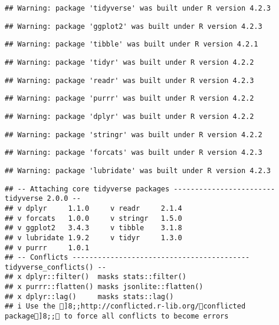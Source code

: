 \documentclass[
]{article}
\begin{document}
\begin{verbatim}
## Warning: package 'tidyverse' was built under R version 4.2.3
\end{verbatim}

\begin{verbatim}
## Warning: package 'ggplot2' was built under R version 4.2.3
\end{verbatim}

\begin{verbatim}
## Warning: package 'tibble' was built under R version 4.2.1
\end{verbatim}

\begin{verbatim}
## Warning: package 'tidyr' was built under R version 4.2.2
\end{verbatim}

\begin{verbatim}
## Warning: package 'readr' was built under R version 4.2.3
\end{verbatim}

\begin{verbatim}
## Warning: package 'purrr' was built under R version 4.2.2
\end{verbatim}

\begin{verbatim}
## Warning: package 'dplyr' was built under R version 4.2.2
\end{verbatim}

\begin{verbatim}
## Warning: package 'stringr' was built under R version 4.2.2
\end{verbatim}

\begin{verbatim}
## Warning: package 'forcats' was built under R version 4.2.3
\end{verbatim}

\begin{verbatim}
## Warning: package 'lubridate' was built under R version 4.2.3
\end{verbatim}

\begin{verbatim}
## -- Attaching core tidyverse packages ------------------------ tidyverse 2.0.0 --
## v dplyr     1.1.0     v readr     2.1.4
## v forcats   1.0.0     v stringr   1.5.0
## v ggplot2   3.4.3     v tibble    3.1.8
## v lubridate 1.9.2     v tidyr     1.3.0
## v purrr     1.0.1     
## -- Conflicts ------------------------------------------ tidyverse_conflicts() --
## x dplyr::filter()  masks stats::filter()
## x purrr::flatten() masks jsonlite::flatten()
## x dplyr::lag()     masks stats::lag()
## i Use the ]8;;http://conflicted.r-lib.org/conflicted package]8;; to force all conflicts to become errors
\end{verbatim}
\end{document}
